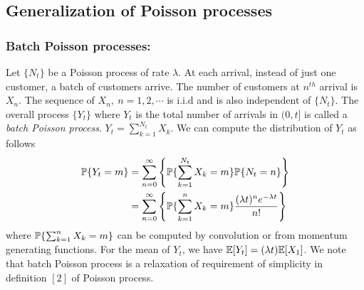 \documentclass[all-lectures.tex]{subfiles}
\begin{document}
\subsection{Generalization of Poisson processes}

\subsubsection*{Batch Poisson processes:}

Let $\{N_t\}$ be a Poisson process of rate $\lambda$. At each arrival, instead of just one customer, a batch of customers arrive. The number of customers at $n^{th}$ arrival is $X_{n}$. The sequence of $X_{n},\ n=1,2,\cdots$ is i.i.d and is also independent of $\{N_t\}$. The overall process $\{Y_t\}$ where $Y_t$ is the total number of arrivals in $(0,t]$ is called a \textit{batch Poisson process}. $Y_t = \sum_{k = 1}^{N_t} X_k$. We can compute the distribution of $Y_t$ as follows
\begin{align*}
\P\{Y_t = m\} &= \sum_{n=0}^{\infty} \left\lbrace \P\{\sum_{k = 1}^{N_t} X_k  =m\} \P\{ N_t= n\}\right\rbrace \\
 &=  \sum_{n=0}^{\infty} \left\lbrace \P\{\sum_{k = 1}^{n} X_k  =m\} \frac{(\lambda t)^n e^{-\lambda t}}{n!}\right\rbrace
\end{align*}
where $\P\{\sum_{k = 1}^{n} X_k  =m\}$ can be computed by convolution or from momentum generating functions.  For the mean of $Y_t$, we have $\E[Y_t] = (\lambda t) \E[X_1]$. We note that batch Poisson process is a relaxation of requirement of simplicity in definition $[2]$ of Poisson process.  
\end{document}
